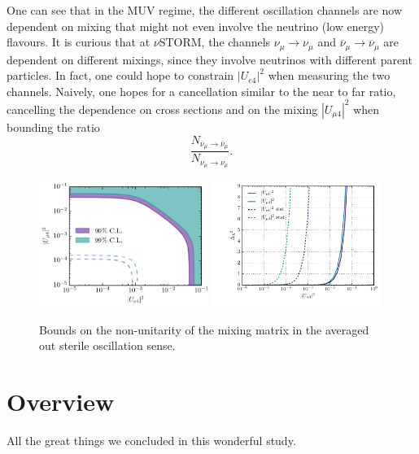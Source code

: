 % 

One can see that in the MUV regime, the different oscillation channels are now dependent on mixing that might not even involve the neutrino (low energy) flavours. It is curious that at $\nu$STORM, the channels $\nu_{\mu} \to \nu_{\mu}$ and $\overline{\nu}_{\mu} \to \overline{\nu}_{\mu}$ are dependent on different mixings, since they involve neutrinos with different parent particles. In fact, one could hope to constrain $|U_{e4}|^2$ when measuring the two channels. Naively, one hopes for a cancellation similar to the near to far ratio, cancelling the dependence on cross sections and on the mixing $|U_{\mu4}|^2$ when bounding the ratio
\[ \frac{ N_{ \overline{\nu}_{\mu} \to \overline{\nu}_{\mu}}}{N_{ \nu_{\mu} \to \nu_{\mu}}} .\]

\begin{figure}
\includegraphics[width=0.49\textwidth]{figs/MUV_joined.pdf}
\includegraphics[width=0.49\textwidth]{figs/MUV_1D.pdf}
\caption{Bounds on the non-unitarity of the mixing matrix in the averaged out sterile oscillation sense. \label{fig:non-uni}}
\end{figure}


\section{Overview}

All the great things we concluded in this wonderful study.

